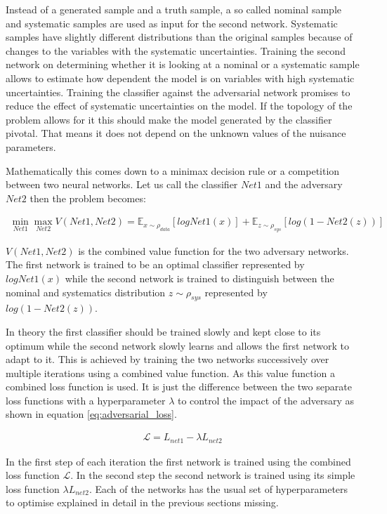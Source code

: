 Instead of a generated sample and a truth sample, a so called nominal sample and systematic samples are used as input for the second network. Systematic samples have slightly different distributions than the original samples because of changes to the variables with the systematic uncertainties. Training the second network on determining whether it is looking at a nominal or a systematic sample allows to estimate how dependent the model is on variables with high systematic uncertainties. Training the classifier against the adversarial network promises to reduce the effect of systematic uncertainties on the model. If the topology of the problem allows for it this should make the model generated by the classifier pivotal. That means it does not depend on the unknown values of the nuisance parameters.

Mathematically this comes down to a minimax decision rule or a competition between two neural networks. Let us call the classifier $Net1$ and the adversary $Net2$ then the problem becomes:

\begin{align}
    \min_{Net1} \max_{Net2} V(Net1, Net2) = \mathbb{E}_{\mathit{x} \sim \rho_{data}} [ log Net1(\mathit{x}) ] + \mathbb{E}_{\mathit{z} \sim \rho_{sys}} [ log (1 - Net2(\mathit{z}) ) ]
\end{align}

$V(Net1, Net2)$ is the combined value function for the two adversary networks. The first network is trained to be an optimal classifier represented by $log Net1(\mathit{x})$ while the second network is trained to distinguish between the nominal and systematics distribution $\mathit{z} \sim \rho_{sys}$ represented by $log (1 - Net2(\mathit{z}))$.

 In theory the first classifier should be trained slowly and kept close to its optimum while the second network slowly learns and allows the first network to adapt to it. This is achieved by training the two networks successively over multiple iterations using a combined value function.
As this value function a combined loss function is used. It is just the difference between the two separate loss functions with a hyperparameter $\lambda$ to control the impact of the adversary as shown in equation \eqref{eq:adversarial_loss}.

\begin{align}
    \mathcal{L} = L_{net1} - \lambda L_{net2}
    \label{eq:adversarial_loss}
\end{align}

In the first step of each iteration the first network is trained using the combined loss function $\mathcal{L}$. In the second step the second network is trained using its simple loss function $\lambda L_{net2}$. Each of the networks has the usual set of hyperparameters to optimise explained in detail in the previous sections missing.

